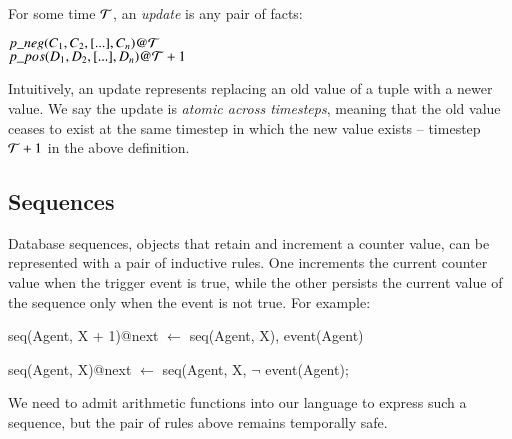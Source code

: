 %
For some time $\Tau$, an {\em update} is any pair of facts:

$p\_neg(C_{1},C_{2},[...],C_{n})@\Tau$ \\ $p\_pos(D_{1},D_{2},[...],D_{n})@\Tau+1$
%

Intuitively, an update represents replacing an old value of a tuple with a
newer value.  We say the update is {\em atomic across timesteps}, meaning that
the old value ceases to exist at the same timestep in which the new value
exists -- timestep $\Tau+1$ in the above definition.

\subsection{Sequences}

Database sequences, objects that retain and increment a counter value, can be
represented with a pair of inductive rules.  One increments the current counter value when the
trigger event is true, while the other persists the current value of the sequence only when the event is 
not true.  For example:

\begin{Dedalus}
seq(Agent, X + 1)@next \(\leftarrow\)
  seq(Agent, X), 
  event(Agent) 
  
seq(Agent, X)@next \(\leftarrow\) 
  seq(Agent, X, 
  \(\lnot\) event(Agent);
\end{Dedalus}

We need to admit arithmetic functions into our language to express such a sequence, but the pair of rules 
above remains temporally safe.
